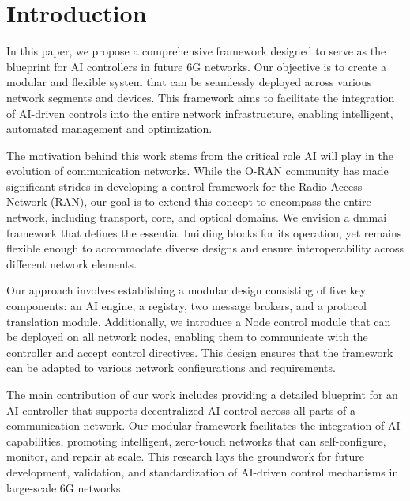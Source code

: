 \section{Introduction}
In this paper, we propose a comprehensive framework designed to serve as the blueprint for AI controllers in future 6G networks. Our objective is to create a modular and flexible system that can be seamlessly deployed across various network segments and devices. This framework aims to facilitate the integration of AI-driven controls into the entire network infrastructure, enabling intelligent, automated management and optimization.

The motivation behind this work stems from the critical role AI will play in the evolution of communication networks. While the O-RAN community has made significant strides in developing a control framework for the Radio Access Network (RAN), our goal is to extend this concept to encompass the entire network, including transport, core, and optical domains. We envision a \ac{dmmai} framework that defines the essential building blocks for its operation, yet remains flexible enough to accommodate diverse designs and ensure interoperability across different network elements.

Our approach involves establishing a modular design consisting of five key components: an AI engine, a registry, two message brokers, and a protocol translation module. Additionally, we introduce a Node control module that can be deployed on all network nodes, enabling them to communicate with the controller and accept control directives. This design ensures that the framework can be adapted to various network configurations and requirements.

The main contribution of our work includes providing a detailed blueprint for an AI controller that supports decentralized AI control across all parts of a communication network. Our modular framework facilitates the integration of AI capabilities, promoting intelligent, zero-touch networks that can self-configure, monitor, and repair at scale. This research lays the groundwork for future development, validation, and standardization of AI-driven control mechanisms in large-scale 6G networks.


